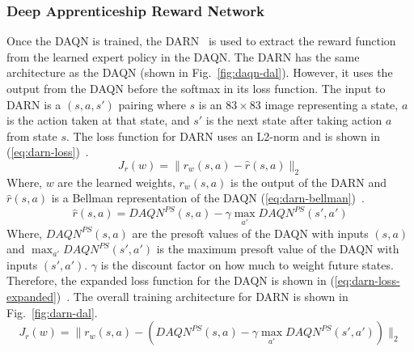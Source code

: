 \documentclass[12pt,american]{report}
\begin{document}
\subsubsection{Deep Apprenticeship Reward Network}
Once the DAQN is trained, the DARN~\cite{markovikj2014deep} is used to extract the reward function from the learned expert policy in the DAQN.  The DARN has the same architecture as the DAQN (shown in Fig.~\ref{fig:daqn-dal}). However, it uses the output from the DAQN before the softmax in its loss function.  The input to DARN is a $(s,a,s')$ pairing where $s$ is an $83\times 83$ image representing a state, $a$ is the action taken at that state, and $s'$ is the next state after taking action $a$ from state $s$. The loss function for DARN uses an L2-norm and is shown in (\ref{eq:darn-loss})~\cite{markovikj2014deep}.
\begin{equation}
     \label{eq:darn-loss}
     J_r(w) =\|r_w(s,a) - \hat{r}(s,a) \|_2%
\end{equation}
Where, $w$ are the learned weights, $r_w(s,a)$ is the output of the DARN and $\hat{r}(s,a)$ is a Bellman representation of the DAQN (\ref{eq:darn-bellman})~\cite{markovikj2014deep}.
\begin{equation}
     \label{eq:darn-bellman}
     \hat{r}(s,a) = DAQN^{PS}(s,a) - \gamma \max_{a'}DAQN^{PS}(s',a')%
\end{equation}
Where, $DAQN^{PS}(s,a)$ are the presoft values of the DAQN with inputs $(s,a)$ and $\max_{a'}DAQN^{PS}(s',a')$ is the maximum presoft value of the DAQN with inputs $(s',a')$. $\gamma$ is the discount factor on how much to weight future states. Therefore, the expanded loss function for the DAQN is shown in (\ref{eq:darn-loss-expanded})~\cite{markovikj2014deep}.  The overall training architecture for DARN is shown in Fig.~\ref{fig:darn-dal}.
\begin{equation}
     \label{eq:darn-loss-expanded}
     J_r(w) =\|r_w(s,a) - (DAQN^{PS}(s,a) - \gamma \max_{a'}DAQN^{PS}(s',a'))\|_2%
\end{equation}
\end{document}

